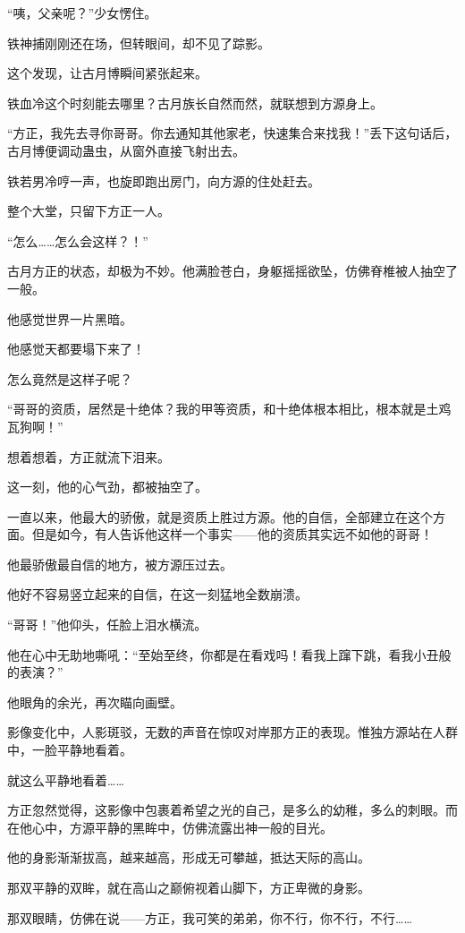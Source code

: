 \begin{this_body}
“咦，父亲呢？”少女愣住。

铁神捕刚刚还在场，但转眼间，却不见了踪影。

这个发现，让古月博瞬间紧张起来。

铁血冷这个时刻能去哪里？古月族长自然而然，就联想到方源身上。

“方正，我先去寻你哥哥。你去通知其他家老，快速集合来找我！”丢下这句话后，古月博便调动蛊虫，从窗外直接飞射出去。

铁若男冷哼一声，也旋即跑出房门，向方源的住处赶去。

整个大堂，只留下方正一人。

“怎么……怎么会这样？！”

古月方正的状态，却极为不妙。他满脸苍白，身躯摇摇欲坠，仿佛脊椎被人抽空了一般。

他感觉世界一片黑暗。

他感觉天都要塌下来了！

怎么竟然是这样子呢？

“哥哥的资质，居然是十绝体？我的甲等资质，和十绝体根本相比，根本就是土鸡瓦狗啊！”

想着想着，方正就流下泪来。

这一刻，他的心气劲，都被抽空了。

一直以来，他最大的骄傲，就是资质上胜过方源。他的自信，全部建立在这个方面。但是如今，有人告诉他这样一个事实——他的资质其实远不如他的哥哥！

他最骄傲最自信的地方，被方源压过去。

他好不容易竖立起来的自信，在这一刻猛地全数崩溃。

“哥哥！”他仰头，任脸上泪水横流。

他在心中无助地嘶吼：“至始至终，你都是在看戏吗！看我上蹿下跳，看我小丑般的表演？”

他眼角的余光，再次瞄向画壁。

影像变化中，人影斑驳，无数的声音在惊叹对岸那方正的表现。惟独方源站在人群中，一脸平静地看着。

就这么平静地看着……

方正忽然觉得，这影像中包裹着希望之光的自己，是多么的幼稚，多么的刺眼。而在他心中，方源平静的黑眸中，仿佛流露出神一般的目光。

他的身影渐渐拔高，越来越高，形成无可攀越，抵达天际的高山。

那双平静的双眸，就在高山之巅俯视着山脚下，方正卑微的身影。

那双眼睛，仿佛在说——方正，我可笑的弟弟，你不行，你不行，不行……


\end{this_body}
